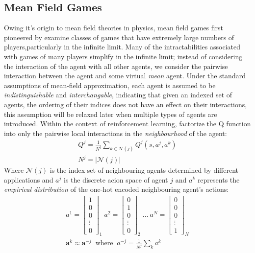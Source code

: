 \subsection{Mean Field Games}
Owing it's origin to mean field theories in physics, mean field games
first pioneered by \cite{Lasry2007} examine classes of games that have extremely large
numbers of players,particularly in the infinite limit. Many of the intractabilities
associated with games of many players simplify in the infinite limit; instead of considering
the interaction of the agent with all other agents, we consider the pairwise interaction
between the agent and some virtual \emph{mean} agent. Under the standard
assumptions of mean-field approximation, each agent is assumed to be
\emph{indistinguishable} and \emph{interchangable}, indicating that given an indexed
set of agents, the ordering of their indices does not have an effect on their
interactions, this assumption will be relaxed later when multiple types of agents
are introduced. Within the context of reinforcement
learning, \cite{Yang2018} factorize the Q function into only the pairwise local interactions
in the \emph{neighbourhood} of the agent:
\begin{equation}
    \begin{gathered}
        Q^j = \frac{1}{N^j} \sum_{k \in \mathcal{N}(j)}Q^j(s,a^j, a^k) \\
        N^j = \vert \mathcal{N}(j) \vert
    \end{gathered}
\end{equation}
Where $\mathcal{N}(j)$ is the index set of neighbouring agents determined by different applications
and $a^j$ is the discrete acion space of agent $j$ and $a^k$ represents the \emph{empirical distribution}
of the one-hot encoded neighbouring agent's actions:
\begin{equation}
    \begin{gathered}
        a^1 = \begin{bmatrix}
            1\\0\\0\\\vdots\\0
        \end{bmatrix}_1
        \;a^2 = \begin{bmatrix}
            0\\1\\0\\\vdots\\0
        \end{bmatrix}_2 \; \hdots\:
        a^N = \begin{bmatrix}
            0\\0\\0\\\vdots\\1
        \end{bmatrix}_N\\
        \mathbf{a}^k \approx \mathbf{a}^{-j} \;\; \text{where} \;\; a^{-j} = \frac{1}{N^j} \sum_k a^k
    \end{gathered}
\end{equation}
